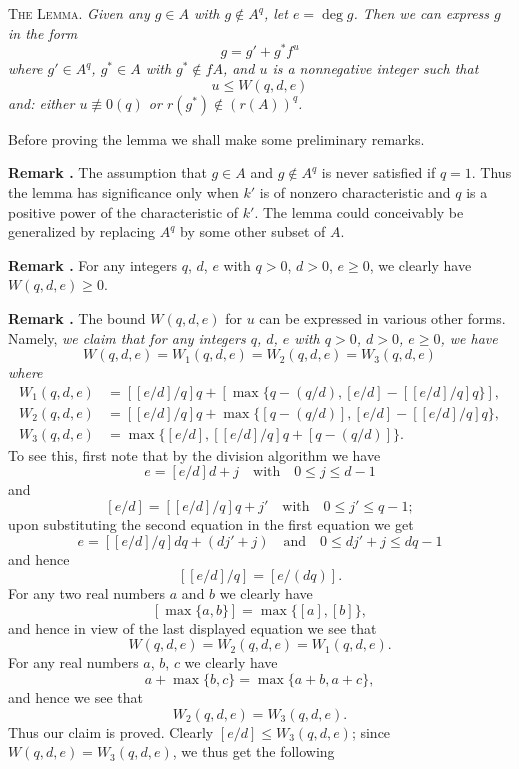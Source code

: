 \medskip
\textsc{The Lemma.} {\em Given any $g\in A$ with $g\not\in A^{q}$, let $e=\deg g$. Then we can express $g$ in the form}
$$
g=g'+g^{*}f^{u}
$$\pageoriginale
{\em where $g'\in A^{q}$, $g^{*}\in A$ with $g^{*}\not\in fA$, and $u$ is a nonnegative integer such that}
$$
u\leq W(q,d,e)
$$
{\em and: either $u\nequiv 0(q)$ or $r(g^{*})\not\in (r(A))^{q}$.}


Before proving the lemma we shall make some preliminary remarks.

\smallskip
\noindent
{\bf Remark .\label{art01-rem1}}
The assumption that $g\in A$ and $g\not\in A^{q}$ is never satisfied if $q=1$. Thus the lemma has significance only when $k'$ is of nonzero characteristic and $q$ is a positive power of the characteristic of $k'$. The lemma could conceivably be generalized by replacing $A^{q}$ by some other subset of $A$.

\smallskip
\noindent
{\bf Remark .\label{art01-rem2}}
For any integers $q$, $d$, $e$ with $q>0$, $d>0$, $e\geq 0$, we clearly have $W(q,d,e)\geq 0$.

\smallskip
\noindent
{\bf Remark .\label{art01-rem3}}
The bound $W(q,d,e)$ for $u$ can be expressed in various other forms. Namely, {\em we claim that for any integers $q$, $d$, $e$ with $q>0$, $d>0$, $e\geq 0$, we have}
$$
W(q,d,e)=W_{1}(q,d,e)=W_{2}(q,d,e)=W_{3}(q,d,e)
$$
{\em where}
\begin{align*}
W_{1}(q,d,e) &= [[e/d]/q]q+[\max\{q-(q/d),[e/d]-[[e/d]/q]q\}],\\
W_{2}(q,d,e) &= [[e/d]/q]q+\max \{[q-(q/d)],[e/d]-[[e/d]/q]q\},\\
W_{3}(q,d,e) &= \max \{[e/d],[[e/d]/q]q+[q-(q/d)]\}.
\end{align*}
To see this, first note that by the division algorithm we have
$$
e=[e/d]d+j\text{~~ with~~ } 0\leq j\leq d-1
$$
and
$$
[e/d]=[[e/d]/q]q+j'\text{~~ with~~ } 0\leq j'\leq q-1;
$$
upon substituting the second equation in the first equation we get 
$$
e=[[e/d]/q]dq+(dj'+j)\text{~~ and~~ } 0\leq dj'+j\leq dq-1
$$
and hence
$$
[[e/d]/q]=[e/(dq)].
$$\pageoriginale
For any two real numbers $a$ and $b$ we clearly have 
$$
[\max \{a,b\}]=\max \{[a],[b]\},
$$ 
and hence in view of the last displayed equation we see that
$$
W(q,d,e)=W_{2}(q,d,e)=W_{1}(q,d,e).
$$
For any real numbers $a$, $b$, $c$ we clearly have
$$
a+\max \{b,c\}=\max \{a+b,a+c\},
$$
and hence we see that
$$
W_{2}(q,d,e)=W_{3}(q,d,e).
$$
Thus our claim is proved. Clearly $[e/d]\leq W_{3}(q,d,e)$; since $W(q,d,e)=W_{3}(q,d,e)$, we thus get the following

